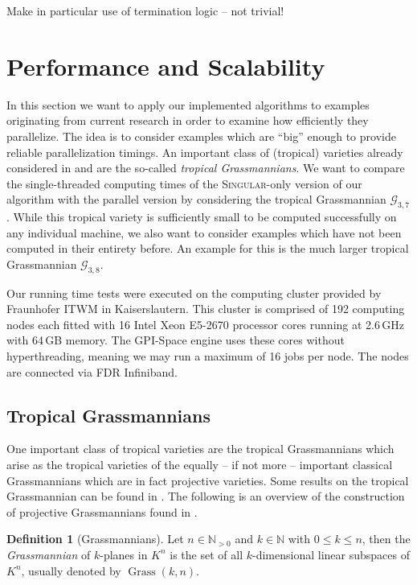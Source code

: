 \documentclass[
  paper=a4,
  titlepage,
  bibliography=totoc,
  pagesize=pdftex
]{scrartcl}
\numberwithin{figure}{section}
\numberwithin{equation}{section}
\numberwithin{table}{section}
\newcommand*\setN{\mathds{N}}
\DeclareMathOperator{\Grass}{Grass}
\theoremstyle{definition}
\newtheorem{definition}{Definition}
\numberwithin{definition}{section}
\begin{document}
Make in particular use of termination logic -- not trivial!


\section{Performance and Scalability}

In this section we want to apply our implemented algorithms to examples originating from
current research in order to examine how efficiently they parallelize. The idea is to
consider examples which are \enquote{big} enough to provide reliable parallelization
timings. An important class of (tropical) varieties already considered in
\cite{tropPointsLinks} and \cite{tropGrass} are the so-called \emph{tropical
Grassmannians}. We want to compare the single-threaded computing times of the
\textsc{Singular}-only version of our algorithm with the parallel version by considering
the tropical Grassmannian $\mathcal G_{3,7}$. While this tropical variety is sufficiently
small to be computed successfully on any individual machine, we also want to consider
examples which have not been computed in their entirety before. An example for this is the
much larger tropical Grassmannian $\mathcal G_{3,8}$.

Our running time tests were executed on the computing cluster provided by Fraunhofer ITWM
in Kaiserslautern. This cluster is comprised of 192 computing nodes each fitted with 16
Intel Xeon E5-2670 processor cores running at 2.6\,GHz with 64\,GB memory. The GPI-Space
engine uses these cores without hyperthreading, meaning we may run a maximum of 16 jobs
per node. The nodes are connected via FDR Infiniband.

\subsection{Tropical Grassmannians}

One important class of tropical varieties are the tropical Grassmannians which arise as
the tropical varieties of the equally -- if not more -- important classical Grassmannians
which are in fact projective varieties. Some results on the tropical Grassmannian can be
found in \cite{tropGrass}. The following is an overview of the construction of projective
Grassmannians found in \cite[Section~8]{gathmAlgGeo}. 

\begin{definition}[Grassmannians]
  Let $n \in \setN_{>0}$ and $k \in \setN$ with $0 \leq k \leq n$, then the
  \emph{Grassmannian} of $k$-planes in $K^n$ is the set of all $k$-dimensional linear
  subspaces of $K^n$, usually denoted by $\Grass(k, n)$.
\end{definition}
\end{document}
